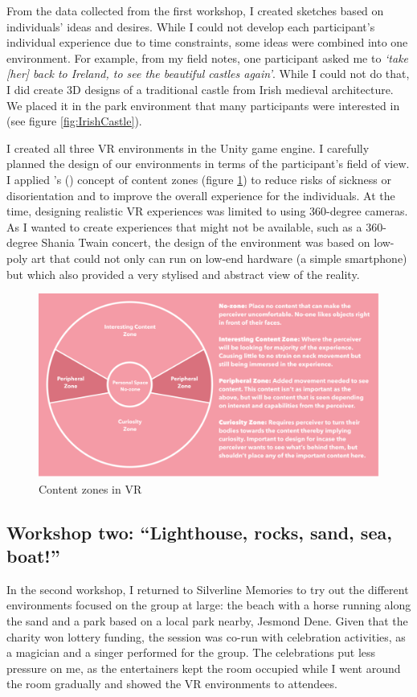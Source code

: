 From the data collected from the first workshop, I created sketches based on individuals' ideas and desires. While I could not develop each participant's individual experience due to time constraints, some ideas were combined into one environment. For example, from my field notes, one participant asked me to \textit{`take [her] back to Ireland, to see the beautiful castles again’}. While I could not do that, I did create 3D designs of a traditional castle from Irish medieval architecture. We placed it in the park environment that many participants were interested in (see figure \ref{fig:IrishCastle}).

I created all three VR environments in the Unity game engine. I carefully planned the design of our environments in terms of the participant's field of view. I applied \citeauthor{alger_visual_2015}'s (\citeyear{alger_visual_2015}) concept of content zones (figure \ref{fig:ContentZone}) to reduce risks of sickness or disorientation and to improve the overall experience for the individuals. At the time, designing realistic VR experiences was limited to using 360-degree cameras. As I wanted to create experiences that might not be available, such as a 360-degree Shania Twain concert, the design of the environment was based on low-poly art that could not only can run on low-end hardware (a simple smartphone) but which also provided a very stylised and abstract view of the reality.

\begin{figure}[htp]
\centering
\includegraphics[width=.8\linewidth]{Images/ChapterFour/ContentZones.png}
\caption{Content zones in VR}
\label{fig:ContentZone}
\end{figure}

\subsection{Workshop two: ``Lighthouse, rocks, sand, sea, boat!''}
\label{StudyOne:WorkshopTwo}
In the second workshop, I returned to Silverline Memories to try out the different environments focused on the group at large: the beach with a horse running along the sand and a park based on a local park nearby, Jesmond Dene. Given that the charity won lottery funding, the session was co-run with celebration activities, as a magician and a singer performed for the group. The celebrations put less pressure on me, as the entertainers kept the room occupied while I went around the room gradually and showed the VR environments to attendees. 

